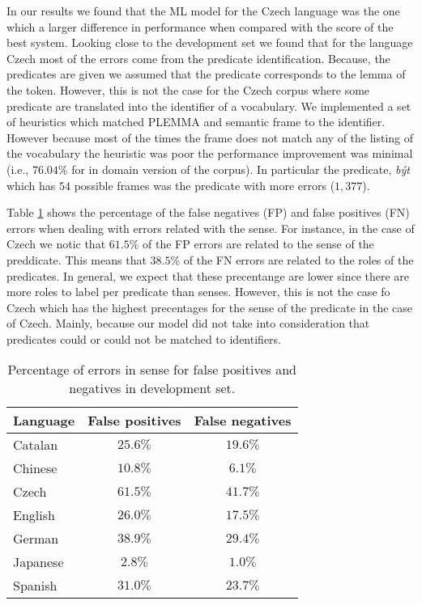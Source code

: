 
In our results we found that the ML model for the Czech language was the one 
which a larger difference in performance when compared with the score of the 
best system. Looking close to the development set we found that for the language 
Czech most of the errors come from the predicate identification. Because, the 
predicates are given we assumed that the predicate corresponds to the lemma of 
the token. However, this is not the case for the Czech corpus where some 
predicate are translated into the identifier of a vocabulary. We implemented a 
set of heuristics which matched PLEMMA and semantic frame to the identifier.  
However because most of the times the frame does not match any of the listing of 
the vocabulary the heuristic was poor the performance improvement was minimal 
(i.e., $76.04\%$ for in domain version of the corpus). In particular the 
predicate, \emph{být} which has $54$ possible frames was the predicate with more 
errors ($1,377$). 

Table \ref{tbl:percentage} shows the percentage of the false negatives (FP) and 
false positives (FN) errors when dealing with errors related with the sense. For 
instance, in the case of Czech we notic that $61.5\%$ of the FP errors are 
related to the sense of the preddicate. This means that $38.5\%$ of the FN 
errors are related to the roles of the predicates. In general, we expect that 
these precentange are lower since there are more roles to label per predicate 
than senses. However, this is not the case fo Czech which has the highest 
precentages for the sense of the predicate in the case of Czech. Mainly, because 
our model did not take into consideration that predicates could or could not be 
matched to identifiers.

\begin{table}
\begin{center}
\small
\begin{tabular}{|l|c|c| }\hline
    Language        & False positives        & False negatives\\\hline
Catalan         & $25.6\%$ & $19.6\%$  \\
Chinese         & $10.8\%$ & $6.1\%$   \\
Czech           & $61.5\%$ & $41.7\%$  \\
English         & $26.0\%$ & $17.5\%$  \\
German          & $38.9\%$ & $29.4\%$  \\
Japanese        & $2.8\%$  & $1.0\%$     \\
Spanish         & $31.0\%$ & $23.7\%$  \\
\hline
\end{tabular}
\caption{Percentage of errors in sense for false positives and negatives in 
development set.}
\label{tbl:percentage}
\normalsize
\end{center}
\end{table}

